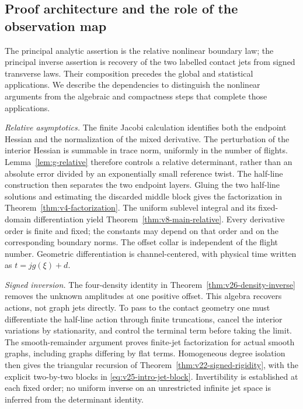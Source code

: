 \subsection{Proof architecture and the role of the observation map}
\label{sec:v39-proof-architecture}

The principal analytic assertion is the relative nonlinear boundary law;
the principal inverse assertion is recovery of the two labelled contact
jets from signed transverse laws.  Their composition precedes the global
and statistical applications.  We describe the dependencies to distinguish
the nonlinear arguments from the algebraic and compactness steps that
complete those applications.

\emph{Relative asymptotics.}
The finite Jacobi calculation identifies both the endpoint Hessian and
the normalization of the mixed derivative.  The perturbation of the
interior Hessian is summable in trace norm, uniformly in the number of
flights.  Lemma~\ref{lem:g-relative} therefore controls a relative
determinant, rather than an absolute error divided by an exponentially
small reference twist.  The half-line construction then separates the
two endpoint layers.  Gluing the two half-line solutions and estimating
the discarded middle block gives the factorization in
Theorem~\ref{thm:v4-factorization}.  The uniform sublevel integral and its
fixed-domain differentiation yield Theorem~\ref{thm:v8-main-relative}.
Every derivative order is finite and fixed; the constants may depend on
that order and on the corresponding boundary norms.  The offset collar
is independent of the flight number.  Geometric differentiation is
channel-centered, with physical time written as \(t=jg(\xi)+d\).

\emph{Signed inversion.}
The four-density identity in Theorem~\ref{thm:v26-density-inverse}
removes the unknown amplitudes at one positive offset.  This algebra
recovers actions, not graph jets directly.  To pass to the contact
geometry one must differentiate the half-line action through finite
truncations, cancel the interior variations by stationarity, and control
the terminal term before taking the limit.  The smooth-remainder
argument proves finite-jet factorization for actual smooth graphs,
including graphs differing by flat terms.  Homogeneous degree isolation
then gives the triangular recursion of
Theorem~\ref{thm:v22-signed-rigidity}, with the explicit two-by-two
blocks in \eqref{eq:v25-intro-jet-block}.  Invertibility is established at
each fixed order; no uniform inverse on an unrestricted infinite jet
space is inferred from the determinant identity.

